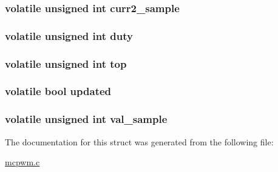 \subsubsection[{curr2\+\_\+sample}]{\setlength{\rightskip}{0pt plus 5cm}volatile unsigned int curr2\+\_\+sample}\label{structmc__timer__struct_ae8dfa699c956026f247b5f4b41f978a3}
\hypertarget{structmc__timer__struct_af41cb3abb6bf4e62e8c669366bb02af1}{}
\subsubsection[{duty}]{\setlength{\rightskip}{0pt plus 5cm}volatile unsigned int duty}\label{structmc__timer__struct_af41cb3abb6bf4e62e8c669366bb02af1}
\hypertarget{structmc__timer__struct_a176bf23e5c7cc33d5b38b845751fd197}{}
\subsubsection[{top}]{\setlength{\rightskip}{0pt plus 5cm}volatile unsigned int top}\label{structmc__timer__struct_a176bf23e5c7cc33d5b38b845751fd197}
\hypertarget{structmc__timer__struct_a887f35472e8fca904645ffb1b0279a74}{}
\subsubsection[{updated}]{\setlength{\rightskip}{0pt plus 5cm}volatile bool updated}\label{structmc__timer__struct_a887f35472e8fca904645ffb1b0279a74}
\hypertarget{structmc__timer__struct_a001e05cb9a513b98cab13e155050c4fc}{}
\subsubsection[{val\+\_\+sample}]{\setlength{\rightskip}{0pt plus 5cm}volatile unsigned int val\+\_\+sample}\label{structmc__timer__struct_a001e05cb9a513b98cab13e155050c4fc}


The documentation for this struct was generated from the following file\+:\begin{DoxyCompactItemize}
\item 
\hyperlink{mcpwm_8c}{mcpwm.\+c}\end{DoxyCompactItemize}
